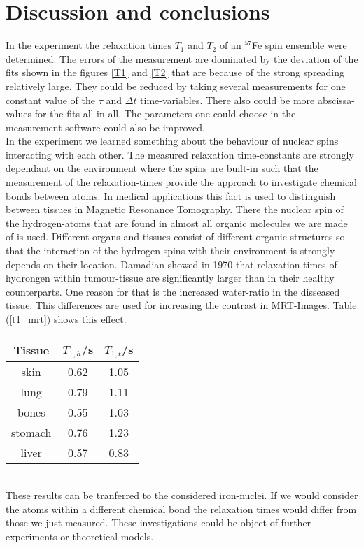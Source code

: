 \section{Discussion and conclusions}
	In the experiment the relaxation times $T_1$ and $T_2$ of an $^{57}$Fe spin ensemble were determined. The errors of the measurement are dominated by the deviation of the fits shown in the figures \ref{T1} and \ref{T2} that are because of the strong spreading relatively large. They could be reduced by taking several measurements for one constant value of the $\tau$ and $\Delta t$ time-variables. There also could be more abscissa-values for the fits all in all. The parameters one could choose in the measurement-software could also be improved.\\
	In the experiment we learned something about the behaviour of nuclear spins interacting with each other. The measured relaxation time-constants are strongly dependant on the environment where the spins are built-in such that the measurement of the relaxation-times provide the approach to investigate chemical bonds between atoms. In medical applications this fact is used to distinguish between tissues in Magnetic Resonance Tomography. There the nuclear spin of the hydrogen-atoms that are found in almost all organic molecules we are made of is used. Different organs and tissues consist of different organic structures so that the interaction of the hydrogen-spins with their environment is strongly depends on their location. Damadian showed in 1970 that relaxation-times of hydrongen within tumour-tissue are significantly larger than in their healthy counterparts. One reason for that is the increased water-ratio in the disseased tissue. This differences are used for increasing the contrast in MRT-Images.\cite{t1Med} Table (\ref{t1_mrt}) shows this effect.\\
	\minipanf
	\centering
		\captionsetup{justification=raggedright, margin =4cm} 
		\begin{tabular}{c|cc}
			Tissue		&		$T_{1,h}$/s		&	$T_{1,t}$/s\\
			\hline
			skin		&		0.62			&	1.05\\
			lung		&		0.79			&	1.11\\
			bones		&		0.55			&	1.03\\
			stomach		&		0.76			&	1.23\\
			liver		&		0.57			&	0.83\\
		\end{tabular} 
		\label{t1_mrt}
	\minipend
	\ \\
	These results can be tranferred to the considered iron-nuclei. If we would consider the atoms within a different chemical bond the relaxation times would differ from those we just measured. These investigations could be object of further experiments or theoretical models.
	


